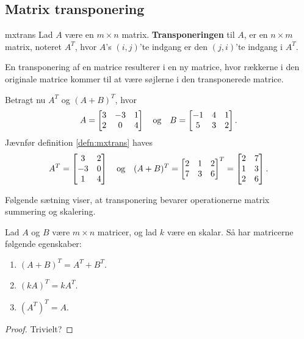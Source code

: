 \subsection{Matrix transponering}
\begin{defn}{}{mxtrans}
Lad $A$ være en $m \times n$ matrix. \textbf{Transponeringen} til $A$, er en $n \times m$ matrix, noteret $A^T$, hvor $A$'s $(i,j)$'te indgang er den $(j,i)$'te indgang i $A^T$.
\end{defn}
En transponering af en matrice resulterer i en ny matrice, hvor rækkerne i den originale matrice kommer til at være søjlerne i den transponerede matrice.

\begin{eks}\label{eks:trans}
Betragt nu $A^T$ og $(A+B)^T$, hvor 
\begin{align*}
A= 
\begin{bmatrix}
3	&	-3	&	1\\
2	&	0	&	4
\end{bmatrix}
\text{\phantom{---}og\phantom{---}}
B= 
\begin{bmatrix}
-1	&	4	&	1\\
5	&	3	&	2
\end{bmatrix}.
\end{align*}
Jævnfør definition \ref{defn:mxtrans} haves
\begin{align*}
A^T =
\begin{bmatrix}
3	&	2\\
-3	&	0\\
1	&	4
\end{bmatrix}
\text{\phantom{---}og\phantom{---}}
(A+B)^T=
\begin{bmatrix}
2	&	1	&	2\\
7	&	3	&	6
\end{bmatrix}^T
=
\begin{bmatrix}
2	&	7\\
1	&	3\\
2	&	6
\end{bmatrix}.
\end{align*}
\end{eks}

Følgende sætning viser, at transponering bevarer operationerne matrix summering og skalering.
\begin{thm}{}{}
Lad $A$ og $B$ være $m \times n$ matricer, og lad $k$ være en skalar.
Så har matricerne følgende egenskaber:
\begin{enumerate}[label=(\alph*)]
\item $(A + B)^T = A^T + B^T$.
\item $(kA)^T = kA^T$.
\item $(A^T)^T = A$.
\end{enumerate}
\end{thm}

\begin{proof}
Trivielt?
\end{proof}